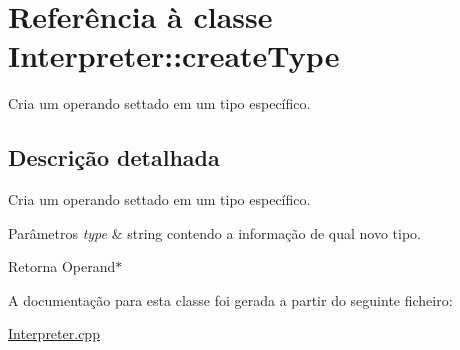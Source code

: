 \hypertarget{class_interpreter_1_1create_type}{}\section{Referência à classe Interpreter\+:\+:create\+Type}
\label{class_interpreter_1_1create_type}


Cria um operando settado em um tipo específico.  




\subsection{Descrição detalhada}
Cria um operando settado em um tipo específico. 


\begin{DoxyParams}{Parâmetros}
{\em type} & string contendo a informação de qual novo tipo. \\
\hline
\end{DoxyParams}
\begin{DoxyReturn}{Retorna}
Operand$\ast$ 
\end{DoxyReturn}


A documentação para esta classe foi gerada a partir do seguinte ficheiro\+:\begin{DoxyCompactItemize}
\item 
\hyperlink{_interpreter_8cpp}{Interpreter.\+cpp}\end{DoxyCompactItemize}

